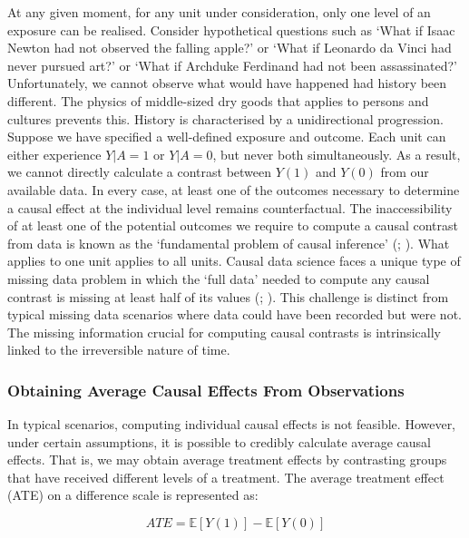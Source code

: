 \documentclass[
  singlecolumn,
  9pt]{article}
\begin{document}
At any given moment, for any unit under consideration, only one level of
an exposure can be realised. Consider hypothetical questions such as
`What if Isaac Newton had not observed the falling apple?' or `What if
Leonardo da Vinci had never pursued art?' or `What if Archduke Ferdinand
had not been assassinated?' Unfortunately, we cannot observe what would
have happened had history been different. The physics of middle-sized
dry goods that applies to persons and cultures prevents this. History is
characterised by a unidirectional progression. Suppose we have specified
a well-defined exposure and outcome. Each unit can either experience
\(Y|A = 1\) or \(Y|A = 0\), but never both simultaneously. As a result,
we cannot directly calculate a contrast between \(Y(1)\) and \(Y(0)\)
from our available data. In every case, at least one of the outcomes
necessary to determine a causal effect at the individual level remains
counterfactual. The inaccessibility of at least one of the potential
outcomes we require to compute a causal contrast from data is known as
the `fundamental problem of causal inference'
(;
). What applies to one unit applies
to all units. Causal data science faces a unique type of missing data
problem in which the `full data' needed to compute any causal contrast
is missing at least half of its values
(;
). This
challenge is distinct from typical missing data scenarios where data
could have been recorded but were not. The missing information crucial
for computing causal contrasts is intrinsically linked to the
irreversible nature of time.

\subsubsection{Obtaining Average Causal Effects From
Observations}\label{obtaining-average-causal-effects-from-observations}

In typical scenarios, computing individual causal effects is not
feasible. However, under certain assumptions, it is possible to credibly
calculate average causal effects. That is, we may obtain average
treatment effects by contrasting groups that have received different
levels of a treatment. The average treatment effect (ATE) on a
difference scale is represented as:

\[
ATE  = \mathbb{E}[Y(1)] - \mathbb{E}[Y(0)]
\]
\end{document}
